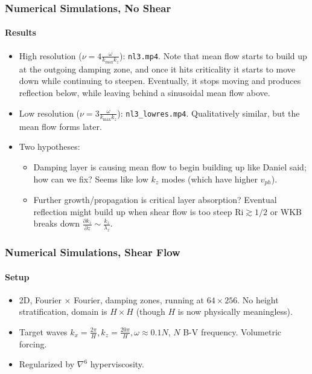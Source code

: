\documentclass[dvipsnames]{beamer}
\newcommand*{\pd}[2]{\frac{\partial#1}{\partial#2}}
\begin{document}
\begin{frame}
    \frametitle{Numerical Simulations, No Shear}
    \framesubtitle{Results}

    \begin{itemize}
        \item High resolution ($\nu = 4\frac{\omega}{k_{\max}k_z}$):
            \lstinline{nl3.mp4}. Note that mean flow starts to build up at the
            outgoing damping zone, and once it hits criticality it starts to
            move down while continuing to steepen. Eventually, it stops moving
            and produces reflection below, while leaving behind a sinusoidal
            mean flow above.

        \item Low resolution ($\nu = 3\frac{\omega}{k_{\max}k_z}$):
            \lstinline{nl3_lowres.mp4}. Qualitatively similar, but the mean flow
            forms later.

        \item Two hypotheses:
            \begin{itemize}
                \item Damping layer is causing mean flow to begin building up
                    like Daniel said; how can we fix? Seems like low $k_z$ modes
                    (which have higher $v_{ph}$).

                \item Further growth/propagation is critical layer absorption?
                    Eventual reflection might build up when shear flow is too
                    steep $\mathrm{Ri} \gtrsim 1/2$ or WKB breaks down
                    $\pd{k_z}{z} \sim \frac{k_z}{\lambda_z}$.
            \end{itemize}
    \end{itemize}
\end{frame}

\begin{frame}
    \frametitle{Numerical Simulations, Shear Flow}
    \framesubtitle{Setup}

    \begin{itemize}
        \item 2D, Fourier $\times$ Fourier, damping zones, running at $64 \times
            256$. No height stratification, domain is $ H \times H$ (though $H$
            is now physically meaningless).

        \item Target waves $k_x = \frac{2\pi}{H}, k_z = \frac{20\pi}{H}, \omega
            \approx 0.1N$, $N$ B-V frequency. Volumetric forcing.

        \item Regularized by $\nabla^6$ hyperviscosity.
    \end{itemize}
\end{frame}
\end{document}
